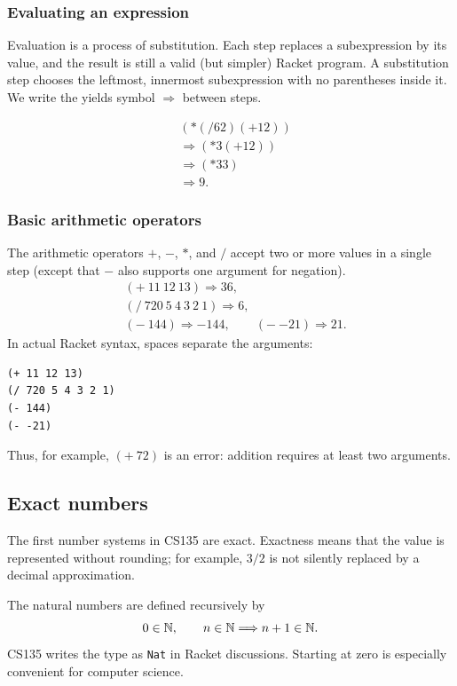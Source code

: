 \subsubsection{Evaluating an expression}
Evaluation is a process of substitution.  Each step replaces a subexpression
by its value, and the result is still a valid (but simpler) Racket program.  A
substitution step chooses the leftmost, innermost subexpression with no
parentheses inside it.  We write the yields symbol $\Rightarrow$ between steps.

\begin{example}
\begin{align*}
&(* (/ 6 2) (+ 1 2)) \\
&\Rightarrow (* 3 (+ 1 2)) \\
&\Rightarrow (* 3 3) \\
&\Rightarrow 9.
\end{align*}
\end{example}

\subsubsection{Basic arithmetic operators}
The arithmetic operators $+$, $-$, $*$, and $/$ accept two or more values in
a single step (except that $-$ also supports one argument for negation).
\begin{align*}
  &( +\ 11\ 12\ 13) \Rightarrow 36, \\
  &( /\ 720\ 5\ 4\ 3\ 2\ 1) \Rightarrow 6, \\
  &(-\ 144) \Rightarrow -144, \qquad (-\ {-21}) \Rightarrow 21.
\end{align*}
In actual Racket syntax, spaces separate the arguments:
\begin{verbatim}
(+ 11 12 13)
(/ 720 5 4 3 2 1)
(- 144)
(- -21)
\end{verbatim}
Thus, for example, $(+\ 72)$ is an error: addition requires at least two
arguments.

\subsection{Exact numbers}
The first number systems in CS135 are exact.  Exactness means that the value
is represented without rounding; for example, $3/2$ is not silently replaced
by a decimal approximation.

\begin{definition}
The natural numbers are defined recursively by
\[
  0\in\mathbb{N}, \qquad n\in\mathbb{N}\Longrightarrow n+1\in\mathbb{N}.
\]
CS135 writes the type as \texttt{Nat} in Racket discussions.  Starting at
zero is especially convenient for computer science.
\end{definition}

